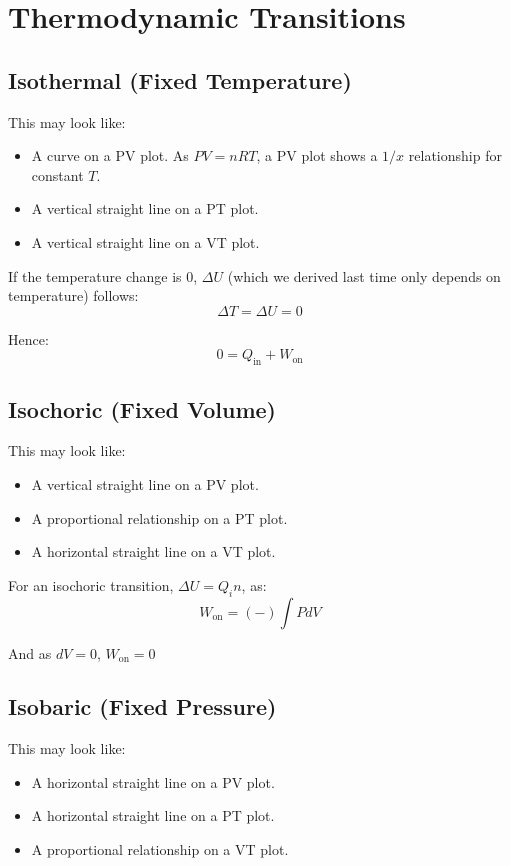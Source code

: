 
\section{Thermodynamic Transitions}
\subsection{Isothermal (Fixed Temperature)}
This may look like:
\begin{itemize}
    \item A curve on a PV plot. As $PV = nRT$, a PV plot shows a $1/x$ relationship for constant $T$.
    \item A vertical straight line on a PT plot.
    \item A vertical straight line on a VT plot.
\end{itemize}

If the temperature change is $0$, $\Delta U$ (which we derived last time only depends on temperature) follows:
\[
    \Delta T = \Delta U = 0
\]

Hence:
\[
    0 = Q_\text{in} + W_\text{on}
\]

\subsection{Isochoric (Fixed Volume)}
This may look like:
\begin{itemize}
    \item A vertical straight line on a PV plot.
    \item A proportional relationship on a PT plot.
    \item A horizontal straight line on a VT plot.
\end{itemize}

For an isochoric transition, $\Delta U = Q_in$, as:
\[
    W_\text{on} = (-) \int P dV
\]

And as $dV = 0$, $W_\text{on} = 0$

\subsection{Isobaric (Fixed Pressure)}
This may look like:
\begin{itemize}
    \item A horizontal straight line on a PV plot.
    \item A horizontal straight line on a PT plot.
    \item A proportional relationship on a VT plot.
\end{itemize}

